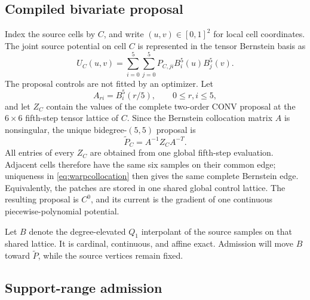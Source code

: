 \subsection{Compiled bivariate proposal}

Index the source cells by \(C\), and write \((u,v)\in[0,1]^2\) for local
cell coordinates.  The joint source potential on cell \(C\) is represented
in the tensor Bernstein basis as
\begin{equation}
 U_C(u,v)=\sum_{i=0}^{5}\sum_{j=0}^{5}
 P_{C,ji}B_i^5(u)B_j^5(v).
 \label{eq:warppatch}
\end{equation}
The proposal controls are not fitted by an optimizer.  Let
\begin{equation}
 A_{ri}=B_i^5(r/5),\qquad 0\leq r,i\leq5,
 \label{eq:warpcollocation}
\end{equation}
and let \(Z_C\) contain the values of the complete two-order CONV proposal at
the \(6\times6\) fifth-step tensor lattice of \(C\).  Since the Bernstein
collocation matrix \(A\) is nonsingular, the unique bidegree-\((5,5)\)
proposal is
\begin{equation}
 \widetilde P_C=A^{-1}Z_CA^{-T}.
 \label{eq:warpproposal}
\end{equation}
All entries of every \(Z_C\) are obtained from one global fifth-step
evaluation.  Adjacent cells therefore have the same six samples on their
common edge; uniqueness in \eqref{eq:warpcollocation} then gives the same
complete Bernstein edge.  Equivalently, the patches are stored in one shared
global control lattice.  The resulting proposal is \(C^0\), and its current
is the gradient of one continuous piecewise-polynomial potential.

Let \(B\) denote the degree-elevated \(Q_1\) interpolant of the source
samples on that shared lattice.  It is cardinal, continuous, and affine
exact.  Admission will move \(B\) toward \(\widetilde P\), while the source
vertices remain fixed.

\subsection{Support-range admission}

